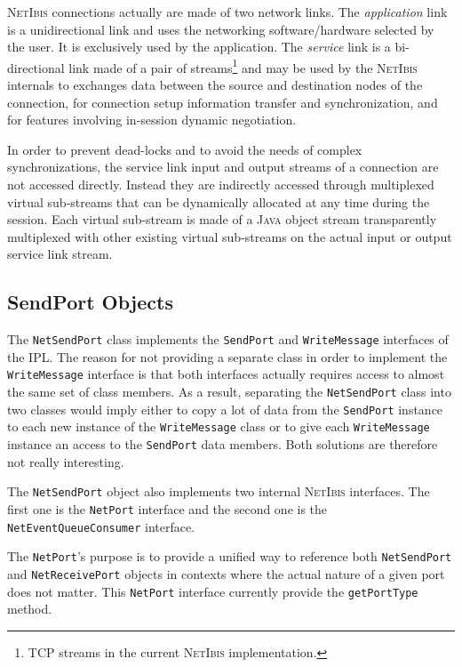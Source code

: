 \documentclass[11pt]{book}
\def\Java{\textsc{Java}\xspace}
\def\NetIbis{\textsc{NetIbis}\xspace}
\begin{document}
\NetIbis connections actually are made of two network links. The
\emph{application} link is a unidirectional link and uses the
networking software/hardware selected by the user. It is exclusively
used by the application. The \emph{service} link is a bi-directional
link made of a pair of streams\footnote{TCP streams in the current
  \NetIbis implementation.} and may be used by the \NetIbis internals
to exchanges data between the source and destination nodes of the
connection, for connection setup information transfer and
synchronization, and for features involving in-session dynamic
negotiation.

In order to prevent dead-locks and to avoid the needs of complex
synchronizations, the service link input and output streams of a
connection are not accessed directly. Instead they are indirectly
accessed through multiplexed virtual sub-streams that can be
dynamically allocated at any time during the session. Each virtual
sub-stream is made of a \Java object stream transparently multiplexed
with other existing virtual sub-streams on the actual input or output
service link stream.

\subsection{SendPort Objects}
\label{sec:sendport-objects}

The \texttt{NetSendPort} class implements the \texttt{SendPort} and
\texttt{WriteMessage} interfaces of the IPL. The reason for not
providing a separate class in order to implement the
\texttt{WriteMessage} interface is that both interfaces actually
requires access to almost the same set of class members. As a result,
separating the \texttt{NetSendPort} class into two classes would imply
either to copy a lot of data from the \texttt{SendPort} instance to
each new instance of the \texttt{WriteMessage} class or to give each
\texttt{WriteMessage} instance an access to the \texttt{SendPort} data
members. Both solutions are therefore not really interesting.

The \texttt{NetSendPort} object also implements two internal \NetIbis
interfaces.  The first one is the \texttt{NetPort} interface and
the second one is the \texttt{NetEventQueueConsumer} interface.

The \texttt{NetPort}'s purpose is to provide a unified way to
reference both \texttt{NetSendPort} and \texttt{NetReceivePort}
objects in contexts where the actual nature of a given port does not
matter. This \texttt{NetPort} interface currently provide the
\texttt{getPortType} method.
\end{document}
